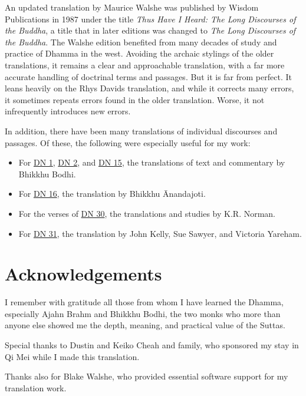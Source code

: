 \documentclass[12pt,openany]{book}%
\begin{document}
An updated translation by Maurice Walshe was published by Wisdom Publications in 1987 under the title \textit{Thus Have I Heard: The Long Discourses of the Buddha}, a title that in later editions was changed to \textit{The Long Discourses of the Buddha}. The Walshe edition benefited from many decades of study and practice of Dhamma in the west. Avoiding the archaic stylings of the older translations, it remains a clear and approachable translation, with a far more accurate handling of doctrinal terms and passages. But it is far from perfect. It leans heavily on the Rhys Davids translation, and while it corrects many errors, it sometimes repeats errors found in the older translation. Worse, it not infrequently introduces new errors.

In addition, there have been many translations of individual discourses and passages. Of these, the following were especially useful for my work:

\begin{itemize}%
\item For \href{https://suttacentral.net/dn1}{DN 1}, \href{https://suttacentral.net/dn2}{DN 2}, and \href{https://suttacentral.net/dn15}{DN 15}, the translations of text and commentary by Bhikkhu Bodhi.%
\item For \href{https://suttacentral.net/dn16}{DN 16}, the translation by Bhikkhu Ānandajoti.%
\item For the verses of \href{https://suttacentral.net/dn30}{DN 30}, the translations and studies by K.R. Norman.%
\item For \href{https://suttacentral.net/dn31}{DN 31}, the translation by John Kelly, Sue Sawyer, and Victoria Yareham.%
\end{itemize}

%
\chapter*{Acknowledgements}

I remember with gratitude all those from whom I have learned the Dhamma, especially Ajahn Brahm and Bhikkhu Bodhi, the two monks who more than anyone else showed me the depth, meaning, and practical value of the Suttas.

Special thanks to Dustin and Keiko Cheah and family, who sponsored my stay in Qi Mei while I made this translation.

Thanks also for Blake Walshe, who provided essential software support for my translation work.
\end{document}
